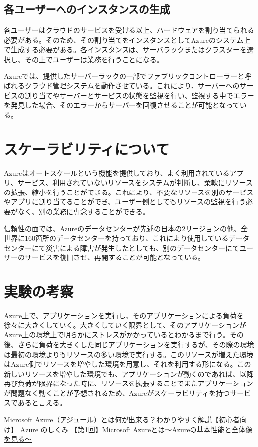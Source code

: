 \documentclass{jsarticle}
\begin{document}
\subsection{各ユーザーへのインスタンスの生成}
各ユーザーはクラウドのサービスを受ける以上、ハードウェアを割り当てられる必要がある。そのため、その割り当てをインスタンスとしてAzureのシステム上で生成する必要がある。各インスタンスは、サーバラックまたはクラスターを選択し、その上でユーザーは業務を行うことになる。
\par Azureでは、提供したサーバーラックの一部でファブリックコントローラーと呼ばれるクラウド管理システムを動作させている。これにより、サーバーへのサービスの割り当てやサーバーとサービスの状態を監視を行い、監視する中でエラーを発見した場合、そのエラーからサーバーを回復させることが可能となっている。
\section{スケーラビリティについて}
Azureはオートスケールという機能を提供しており、よく利用されているアプリ、サービス、利用されていないリソースをシステムが判断し、柔軟にリソースの拡張、縮小を行うことができる。これにより、不要なリソースを別のサービスやアプリに割り当てることができ、ユーザー側としてもリソースの監視を行う必要がなく、別の業務に専念することができる。
\par 信頼性の面では、Azureのデータセンターが先述の日本の2リージョンの他、全世界に160箇所のデータセンターを持っており、これにより使用しているデータセンターにて災害による障害が発生したとしても、別のデータセンターにてユーザーのサービスを復旧させ、再開することが可能となっている。
\section{実験の考察}
Azure上で、アプリケーションを実行し、そのアプリケーションによる負荷を徐々に大きくしていく。大きくしていく限界として、そのアプリケーションがAzure上の環境上で明らかにストレスがかかっているとわかるまで行う。その後、さらに負荷を大きくした同じアプリケーションを実行するが、その際の環境は最初の環境よりもリソースの多い環境で実行する。このリソースが増えた環境はAzure側でリソースを増やした環境を用意し、それを利用する形になる。この新しいリソースを増やした環境でも、アプリケーションが動くのであれば、以降再び負荷が限界になった時に、リソースを拡張することでまたアプリケーションが問題なく動くことが予想されるため、Azureがスケーラビリティを持つサービスであると言える。
\begin{thebibliography}{9}
     \href{https://www.jbcc.co.jp/blog/column/azure-mechanism.html}{Microsoft Azure（アジュール）とは何が出来る？わかりやすく解説【初心者向け】}
     \href{https://learn.microsoft.com/ja-jp/azure/cloud-adoption-framework/get-started/what-is-azure}{Azure のしくみ}
     \href{https://www.fsi.co.jp/blog/5520/}{【第1回】Microsoft Azureとは～Azureの基本性能と全体像を見る～}
\end{thebibliography}
\end{document}
